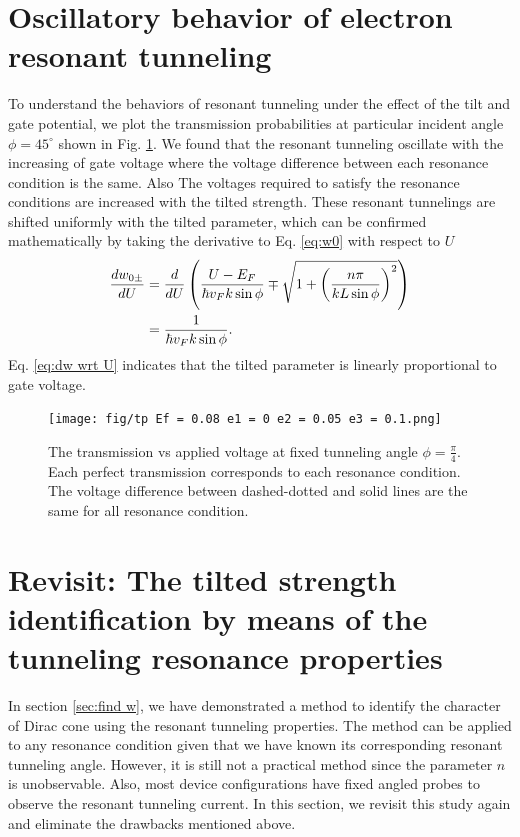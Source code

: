 \section{Oscillatory behavior of electron resonant tunneling} \label{sec:oscillation}
    To understand the behaviors of resonant tunneling under the effect of the tilt and gate potential, 
    we plot the transmission probabilities at particular incident angle $\phi = 45^{\circ}$ shown in Fig. \ref{fig:tp 45 deg}.
    We found that the resonant tunneling oscillate with the increasing of gate voltage where the voltage difference between each resonance condition is the same.
    Also The voltages required to satisfy the resonance conditions are increased with the tilted strength.
    These resonant tunnelings are shifted uniformly with the tilted parameter, which can be confirmed mathematically by taking the derivative to Eq. \ref{eq:w0} with respect to $U$
    \begin{align} \label{eq:dw wrt U}
        \frac{d w_{0\pm}}{dU} &= \frac{d}{dU} \left(\frac{U-E_F}{\hbar v_F k \sin{\phi}}\mp \sqrt{1+\left(\frac{n \pi}{k L \sin{\phi}}\right)^2}\right) \notag \\
                              &= \frac{1}{\hbar v_F k \sin{\phi}}.
    \end{align}
    Eq. \ref{eq:dw wrt U} indicates that the tilted parameter is linearly proportional to gate voltage.
    \begin{figure}[H]
        \centering
            \texttt{[image: fig/tp Ef = 0.08 e1 = 0 e2 = 0.05 e3 = 0.1.png]}
            \caption{The transmission vs applied voltage at fixed tunneling angle $\phi = \frac{\pi}{4}$. 
                        Each perfect transmission corresponds to each resonance condition. 
                        The voltage difference between dashed-dotted and solid lines are the same for all resonance condition.}
        \label{fig:tp 45 deg}
    \end{figure}

\section{Revisit: The tilted strength identification by means of the tunneling resonance properties} \label{sec:find w 2}
    In section \ref{sec:find w}, we have demonstrated a method to identify the character of Dirac cone using the resonant tunneling properties.
    The method can be applied to any resonance condition given that we have known its corresponding resonant tunneling angle.
    However, it is still not a practical method since the parameter $n$ is unobservable.
    Also, most device configurations have fixed angled probes to observe the resonant tunneling current.
    In this section, we revisit this study again and eliminate the drawbacks mentioned above.\\
    
